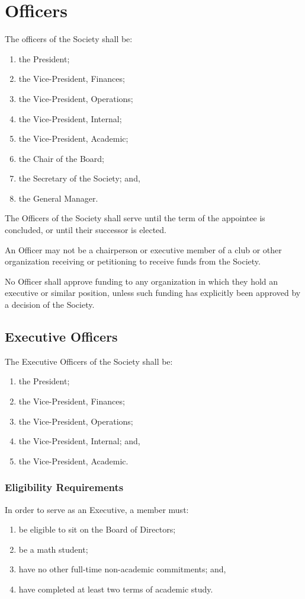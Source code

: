\section{Officers}

The officers of the Society shall be:
\begin{enumerate}
    \item the President; 
    \item the Vice-President, Finances; 
    \item the Vice-President, Operations; 
    \item the Vice-President, Internal;
    \item the Vice-President, Academic;
    \item the Chair of the Board;
    \item the Secretary of the Society; and,
    \item the General Manager.
\end{enumerate}

The Officers of the Society shall serve until the term of the appointee is
concluded, or until their successor is elected. 

An Officer may not be a chairperson or executive member of a club or other 
organization receiving or petitioning to receive funds from the Society. 

No Officer shall approve funding to any organization in which they hold an
executive or similar position, unless such funding has explicitly been approved
by a decision of the Society.

\subsection{Executive Officers}
The Executive Officers of the Society shall be: \begin{enumerate}
    \item the President; 
    \item the Vice-President, Finances; 
    \item the Vice-President, Operations; 
    \item the Vice-President, Internal; and,
    \item the Vice-President, Academic.
\end{enumerate}

\subsubsection{Eligibility Requirements}
In order to serve as an Executive, a member must:
\begin{enumerate}
    \item be eligible to sit on the Board of Directors;
    \item be a math student; 
    \item have no other full-time non-academic commitments; and,
    \item have completed at least two terms of academic study.
\end{enumerate}

